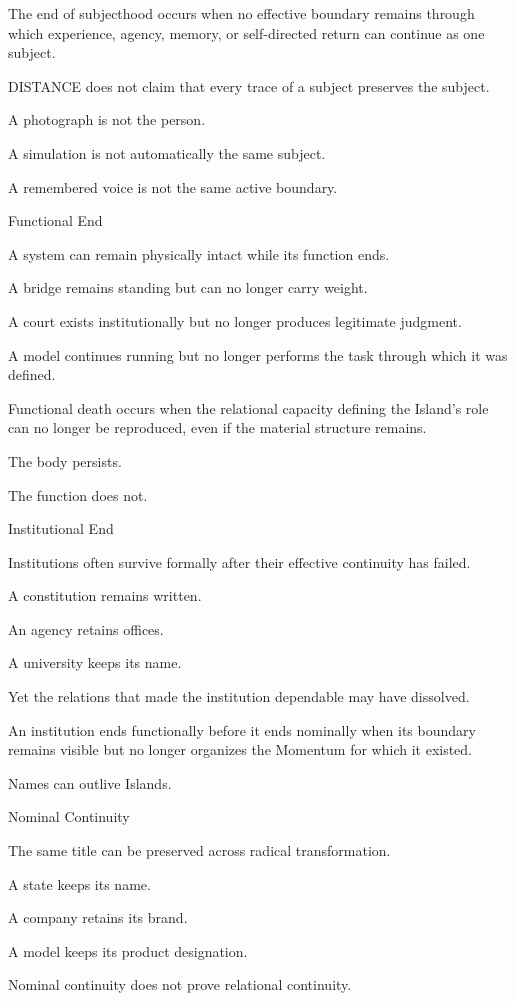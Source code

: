 The end of subjecthood occurs when no effective boundary remains through which experience, agency, memory, or self-directed return can continue as one subject.

DISTANCE does not claim that every trace of a subject preserves the subject.

A photograph is not the person.

A simulation is not automatically the same subject.

A remembered voice is not the same active boundary.

Functional End

A system can remain physically intact while its function ends.

A bridge remains standing but can no longer carry weight.

A court exists institutionally but no longer produces legitimate judgment.

A model continues running but no longer performs the task through which it was defined.

Functional death occurs when the relational capacity defining the Island’s role can no longer be reproduced, even if the material structure remains.

The body persists.

The function does not.

Institutional End

Institutions often survive formally after their effective continuity has failed.

A constitution remains written.

An agency retains offices.

A university keeps its name.

Yet the relations that made the institution dependable may have dissolved.

An institution ends functionally before it ends nominally when its boundary remains visible but no longer organizes the Momentum for which it existed.

Names can outlive Islands.

Nominal Continuity

The same title can be preserved across radical transformation.

A state keeps its name.

A company retains its brand.

A model keeps its product designation.

Nominal continuity does not prove relational continuity.


